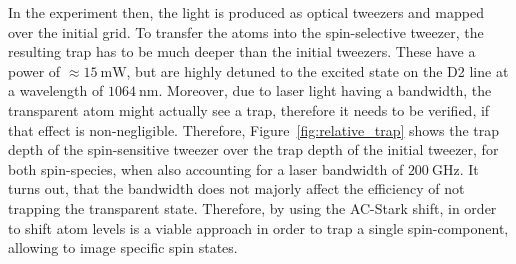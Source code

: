 \begin{figure}[t]%
%
\end{figure}%

In the experiment then, the light is produced as optical tweezers and mapped over the initial grid. To transfer the atoms into the spin-selective tweezer, the resulting trap has to be much deeper than the initial tweezers. These have a power of $\approx\SI{15}{\milli\watt}$, but are highly detuned to the excited state on the D2 line at a wavelength of $\SI{1064}{\nano\meter}$. Moreover, due to laser light having a bandwidth, the transparent atom might actually see a trap, therefore it needs to be verified, if that effect is non-negligible. Therefore, Figure~\ref{fig:relative_trap} shows the trap depth of the spin-sensitive tweezer over the trap depth of the initial tweezer, for both spin-species, when also accounting for a laser bandwidth of $\SI{200}{\giga\hertz}$. It turns out, that the bandwidth does not majorly affect the efficiency of not trapping the transparent state. Therefore, by using the AC-Stark shift, in order to shift atom levels is a viable approach in order to trap a single spin-component, allowing to image specific spin states.


\begin{figure}[t]%
\end{figure}

